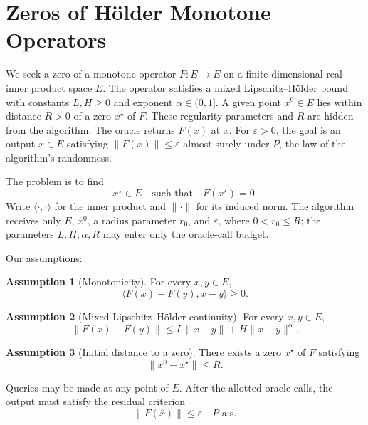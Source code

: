 \documentclass[10pt]{article}
\theoremstyle{definition}
\newtheorem{assumption}{Assumption}
\begin{document}
\section*{Zeros of H\"older Monotone Operators}
We seek a zero of a monotone operator $F:E\to E$ on a finite-dimensional real inner product space $E$. The operator satisfies a mixed Lipschitz--H\"older bound with constants $L,H\geq 0$ and exponent $\alpha\in(0,1]$. A given point $x^0\in E$ lies within distance $R>0$ of a zero $x^\star$ of $F$. These regularity parameters and $R$ are hidden from the algorithm. The oracle returns $F(x)$ at $x$. For $\varepsilon>0$, the goal is an output $\bar{x}\in E$ satisfying $\|F(\bar{x})\|\leq\varepsilon$ almost surely under $P$, the law of the algorithm's randomness.

The problem is to find
\[
x^\star\in E\quad\text{such that}\quad F(x^\star)=0.
\]
Write $\langle\cdot,\cdot\rangle$ for the inner product and $\|\cdot\|$ for its induced norm. The algorithm receives only $E$, $x^0$, a radius parameter $r_0$, and $\varepsilon$, where $0<r_0\leq R$; the parameters $L,H,\alpha,R$ may enter only the oracle-call budget.

Our assumptions:
\begin{assumption}[Monotonicity]
For every $x,y\in E$,
\[
\langle F(x)-F(y),x-y\rangle\geq 0.
\]
\end{assumption}

\begin{assumption}[Mixed Lipschitz--H\"older continuity]
For every $x,y\in E$,
\[
\|F(x)-F(y)\|
\leq L\|x-y\|+H\|x-y\|^{\alpha}.
\]
\end{assumption}

\begin{assumption}[Initial distance to a zero]
There exists a zero $x^\star$ of $F$ satisfying
\[
\|x^0-x^\star\|\leq R.
\]
\end{assumption}

Queries may be made at any point of $E$. After the allotted oracle calls, the output must satisfy the residual criterion
\[
\|F(\bar{x})\|\leq\varepsilon
\quad P\text{-a.s.}
\]
\end{document}
